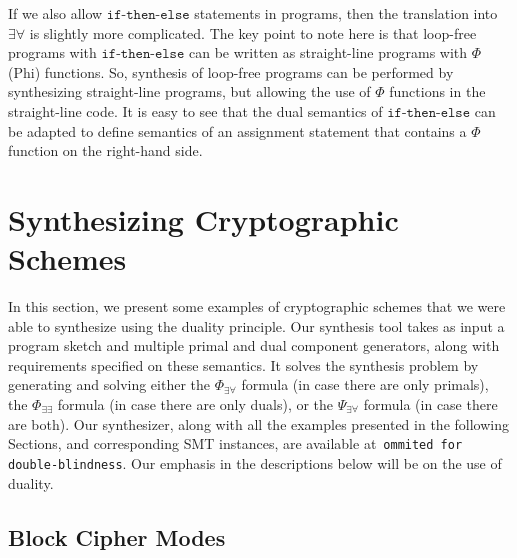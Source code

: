 \documentclass[preprint]{sig-alternate-05-2015}
\def\ite{{\texttt{if-then-else}}}
\begin{document}
{If we also allow $\ite$ statements in programs, then the
translation into $\exists\forall$ is slightly more
complicated.   The key point to note here is that
loop-free programs with $\ite$ can be written
as straight-line programs with $\Phi$ (Phi) functions.
So, synthesis of loop-free programs can be performed
by synthesizing straight-line programs, but allowing the
use of $\Phi$ functions in the straight-line code.
It is easy to see that the dual semantics of $\ite$
can be adapted to define semantics of an assignment
statement that contains a $\Phi$ function on the right-hand
side.



\endignore}


\section{Synthesizing Cryptographic Schemes}
\label{sec:application}

In this section, we present some examples of cryptographic schemes that we
were able to synthesize using the duality principle.
Our synthesis tool takes as input a program sketch and multiple primal 
and dual component generators, along with requirements
specified on these semantics. It solves the synthesis problem by
generating and solving either 
the $\Phi_{\exists\forall}$ formula (in case there are only primals),
the $\Phi_{\exists\exists}$ formula (in case there are only duals), or the 
$\Psi_{\exists\forall}$ formula (in case there are both).
Our synthesizer, along with all the examples 
presented in the following Sections,
and corresponding 
SMT instances, are available at~\texttt{ommited for double-blindness}.
Our emphasis in the descriptions below will be on the use of duality.

\subsection{Block Cipher Modes}
\end{document}
